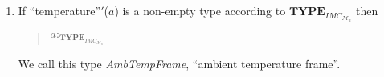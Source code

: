 \begin{enumerate}
\item If ``temperature''$'$($a$) is a non-empty type according to
  $\mathbf{TYPE}_{\mathit{IMC}_{\mathscr{M}_n}}$ then
\begin{quote}
$a:_{\mathbf{TYPE}_{\mathit{IMC}_{\mathscr{M}_n}}}$ 
\end{quote}

We call this type \textit{AmbTempFrame}, ``ambient temperature frame''. 
\end{enumerate} 

